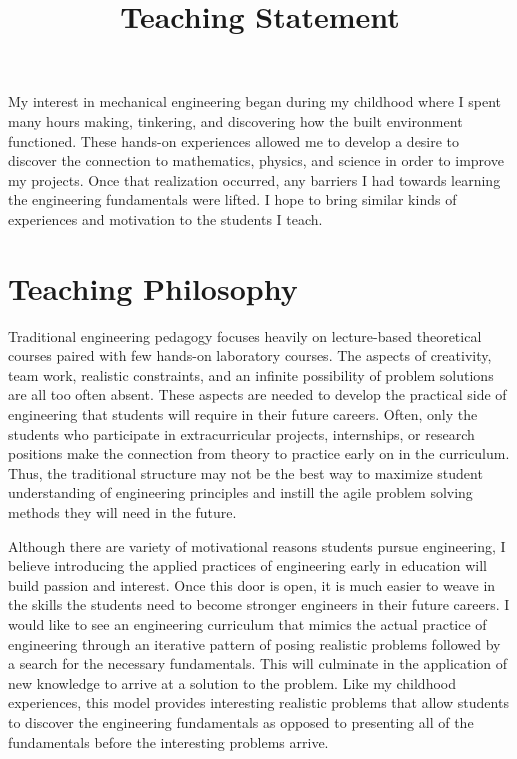 \documentclass{article}
\title{Teaching Statement}
\date{}
\begin{document}
\maketitle

My interest in mechanical engineering began during my childhood where I spent
many hours making, tinkering, and discovering how the built environment
functioned. These hands-on experiences allowed me to develop a desire to
discover the connection to mathematics, physics, and science in order to
improve my projects. Once that realization occurred, any barriers I had towards
learning the engineering fundamentals were lifted. I hope to bring similar
kinds of experiences and motivation to the students I teach.

\section*{Teaching Philosophy}
%
Traditional engineering pedagogy focuses heavily on lecture-based theoretical
courses paired with few hands-on laboratory courses. The aspects of creativity,
team work, realistic constraints, and an infinite possibility of problem
solutions are all too often absent. These aspects are needed to develop the
practical side of engineering that students will require in their future
careers. Often, only the students who participate in extracurricular projects,
internships, or research positions make the connection from theory to practice
early on in the curriculum. Thus, the traditional structure may not be the best
way to maximize student understanding of engineering principles and instill the
agile problem solving methods they will need in the future.

Although there are variety of motivational reasons students pursue engineering,
I believe introducing the applied practices of engineering early in education
will build passion and interest. Once this door is open, it is much easier to
weave in the skills the students need to become stronger engineers in their
future careers. I would like to see an engineering curriculum that mimics the
actual practice of engineering through an iterative pattern of posing realistic
problems followed by a search for the necessary fundamentals. This will
culminate in the application of new knowledge to arrive at a solution to the
problem. Like my childhood experiences, this model provides interesting
realistic problems that allow students to discover the engineering fundamentals
as opposed to presenting all of the fundamentals before the interesting
problems arrive.
\end{document}
